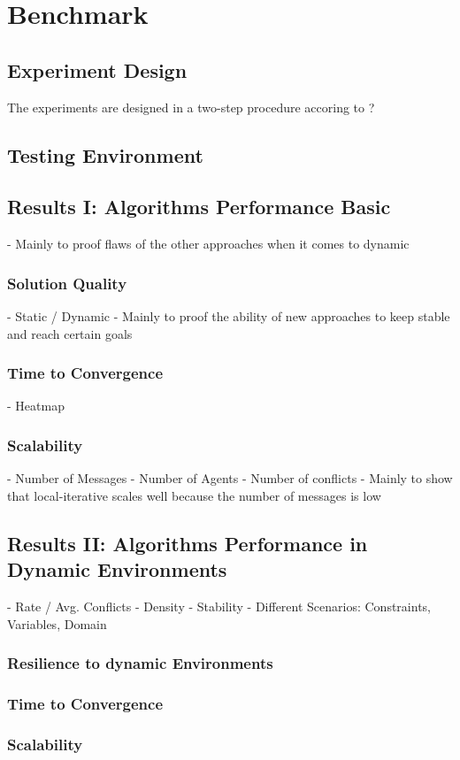 \chapter{Benchmark}
\section{Experiment Design}
The experiments are designed in a two-step procedure accoring to ?

\section{Testing Environment}

\section{Results I: Algorithms Performance Basic}

- Mainly to proof flaws of the other approaches when it comes to dynamic
\subsection{Solution Quality}
- Static / Dynamic
- Mainly to proof the ability of new approaches to keep stable and reach certain goals
\subsection{Time to Convergence}
- Heatmap


\subsection{Scalability}
-  Number of Messages
- Number of Agents
- Number of conflicts
- Mainly to show that local-iterative scales well because the number of messages is low

\section{Results II: Algorithms Performance in Dynamic Environments}

- Rate / Avg. Conflicts - Density
- Stability
- Different Scenarios: Constraints, Variables, Domain

\subsection{Resilience to dynamic Environments}
\subsection{Time to Convergence}
\subsection{Scalability}